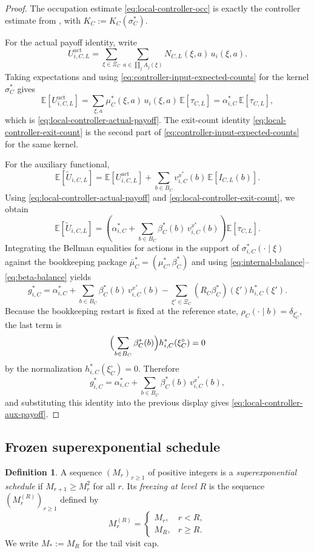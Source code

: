 \documentclass[12pt]{article}
\theoremstyle{definition}
\newtheorem{definition}[theorem]{Definition}
\newcommand{\E}{\mathbb{E}}
\newcommand{\1}{\mathbf{1}}
\begin{document}
\begin{proof}
The occupation estimate \eqref{eq:local-controller-occ} is exactly the controller
estimate from , with $K_C:=K_C(\sigma_C^*)$.

For the actual payoff identity, write
\[
U_{i,C,L}^{\mathrm{act}}
=
\sum_{\xi\in\Xi_C}
\sum_{a\in\prod_j A_j(\xi)}
N_{C,L}(\xi,a)\,u_i(\xi,a).
\]
Taking expectations and using \eqref{eq:controller-input-expected-counts} for the
kernel $\sigma_C^*$ gives
\[
\E[U_{i,C,L}^{\mathrm{act}}]
=
\sum_{\xi,a}
\mu_C^*(\xi,a)\,u_i(\xi,a)\,\E[\tau_{C,L}]
=
\alpha_{i,C}^*\,\E[\tau_{C,L}],
\]
which is \eqref{eq:local-controller-actual-payoff}. The exit-count identity
\eqref{eq:local-controller-exit-count} is the second part of
\eqref{eq:controller-input-expected-counts} for the same kernel.

For the auxiliary functional,
\[
\E[\widetilde U_{i,C,L}]
=
\E[U_{i,C,L}^{\mathrm{act}}]
+
\sum_{b\in B_C} v_{i,C}^{x^*}(b)\,\E[I_{C,L}(b)].
\]
Using \eqref{eq:local-controller-actual-payoff} and
\eqref{eq:local-controller-exit-count}, we obtain
\[
\E[\widetilde U_{i,C,L}]
=
\left(
\alpha_{i,C}^*
+
\sum_{b\in B_C}\beta_C^*(b)\,v_{i,C}^{x^*}(b)
\right)\E[\tau_{C,L}].
\]
Integrating the Bellman equalities for actions in the support of
$\sigma_{i,C}^*(\cdot\mid\xi)$ against the bookkeeping package
$\bar\mu_C^*=(\mu_C^*,\beta_C^*)$ and using
\eqref{eq:internal-balance}--\eqref{eq:beta-balance} yields
\begin{equation}
\label{eq:node-gain-identity}
g_{i,C}^*
=
\alpha_{i,C}^*
+
\sum_{b\in B_C}\beta_C^*(b)\,v_{i,C}^{x^*}(b)
-
\sum_{\xi'\in\Xi_C}(R_C\beta_C^*)(\xi')h_{i,C}^*(\xi').
\end{equation}
Because the bookkeeping restart is fixed at the reference state,
$\rho_C(\cdot\mid b)=\delta_{\xi_C^\circ}$, the last term is
\[
\Bigl(\sum_{b\in B_C}\beta_C^*(b)\Bigr)h_{i,C}^*(\xi_C^\circ)=0
\]
by the normalization $h_{i,C}^*(\xi_C^\circ)=0$. Therefore
\[
g_{i,C}^*
=
\alpha_{i,C}^*
+
\sum_{b\in B_C}\beta_C^*(b)\,v_{i,C}^{x^*}(b),
\]
and substituting this identity into the previous display gives
\eqref{eq:local-controller-aux-payoff}.
\end{proof}


\subsection{Frozen superexponential schedule}

\begin{definition}
A sequence $(M_r)_{r\ge 1}$ of positive integers is a
\emph{superexponential schedule} if $M_{r+1}\ge M_r^2$ for all $r$. Its
\emph{freezing at level $R$} is the sequence $(M_r^{(R)})_{r\ge 1}$ defined by
\[
M_r^{(R)}=
\begin{cases}
M_r, & r<R,\\
M_R, & r\ge R.
\end{cases}
\]
We write $M_*:=M_R$ for the tail visit cap.
\end{definition}
\end{document}
